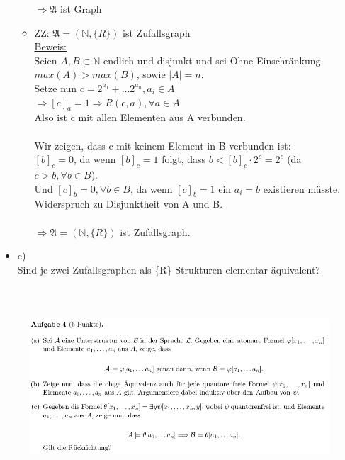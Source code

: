 \documentclass[a4paper]{scrartcl}
\begin{document}
\begin{itemize}
\begin{itemize}
                    $\Rightarrow \mathfrak{A}$ ist Graph
                
                \item \underline{ZZ:} $\mathfrak{A} = (\mathds{N}, \{R\})$ ist Zufallsgraph\\
                    \underline{Beweis:}\\
                    Seien $A,B \subset \mathds{N}$ endlich und disjunkt und sei Ohne Einschränkung $max(A) > max(B)$, sowie $|A| = n$.\\
                    Setze nun $c = 2^{a_1} + \dots 2^{a_n}, a_i \in A$\\
                    $\Rightarrow [c]_a = 1 \Rightarrow R(c,a), \forall a \in A$\\
                    Also ist c mit allen Elementen aus A verbunden.\\
                    \\Wir zeigen, dass c mit keinem Element in B verbunden ist:\\
                    $[b]_c = 0$, da wenn $[b]_c = 1$ folgt, dass $b < [b]_c \cdot 2^c = 2^c$ (da $c > b, \forall b \in B$).\\
                    Und $[c]_b = 0, \forall b \in B$, da wenn $[c]_b = 1$ ein $a_i = b$ existieren müsste. Widerspruch zu Disjunktheit von A und B.\\
                    \\$\Rightarrow \mathfrak{A} = (\mathds{N}, \{R\})$ ist Zufallsgraph.

            \end{itemize}
        \item c)\\
            Sind je zwei Zufallsgraphen als \{R\}-Strukturen elementar äquivalent?\\

            \\

    \end{itemize}

\section*{}%
\label{sec:aufgabe_4}

    \begin{figure}[H]
        \centering
        \includegraphics[scale=0.6]{./A-4.png}
        \label{fig:}
    \end{figure}
\end{document}
